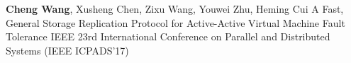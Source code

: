 \cvpub
{\textbf{Cheng Wang}, Xusheng Chen, Zixu Wang, Youwei Zhu, Heming Cui} %
{A Fast, General Storage Replication Protocol for Active-Active Virtual Machine Fault  Tolerance} %
{} %
{} %
{ %
IEEE 23rd International Conference on Parallel and Distributed Systems (IEEE ICPADS'17)
}

